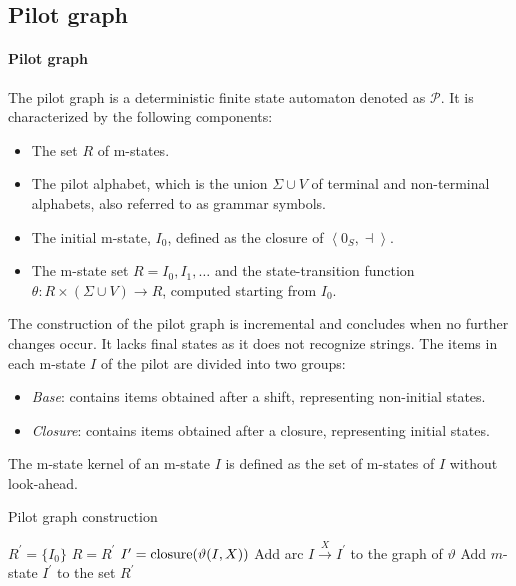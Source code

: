 \subsection{Pilot graph}
\paragraph*{Pilot graph}
The pilot graph is a deterministic finite state automaton denoted as $\mathcal{P}$. 
It is characterized by the following components:
\begin{itemize}
    \item The set $R$ of m-states. 
    \item The pilot alphabet, which is the union $\Sigma\cup V$ of terminal and non-terminal alphabets, also referred to as grammar symbols.
    \item The initial m-state, $I_0$, defined as the closure of $\left\langle 0_S, \dashv \right\rangle$.
    \item The m-state set $R={I_0,I_1,\dots}$ and the state-transition function $\theta:R \times (\Sigma \cup V) \rightarrow R$, computed starting from $I_0$. 
\end{itemize}
The construction of the pilot graph is incremental and concludes when no further changes occur.
It lacks final states as it does not recognize strings.
The items in each m-state $I$ of the pilot are divided into two groups:
\begin{itemize}
    \item \textit{Base}: contains items obtained after a shift, representing non-initial states.
    \item \textit{Closure}: contains items obtained after a closure, representing initial states.
\end{itemize}
\begin{definition}
    The m-state kernel of an m-state $I$ is defined as the set of m-states of $I$ without look-ahead.
\end{definition}
\begin{algorithm}[H]
    \caption{Pilot graph construction}
        \begin{algorithmic}[1]
            \State $R^{\prime} = \{I_0\}$
                \State $R = R^{\prime}$
                    \State $I^{\prime} = \textnormal{closure}(\vartheta(I,X))$
                        \State Add arc $I \overset{X}{\rightarrow} I^{\prime}$ to the graph of $\vartheta$
                            \State Add $m$-state $I^{\prime}$ to the set $R^{\prime}$
                        \EndIf
                    \EndIf
                \EndFor
            \EndWhile
        \end{algorithmic}
\end{algorithm}

